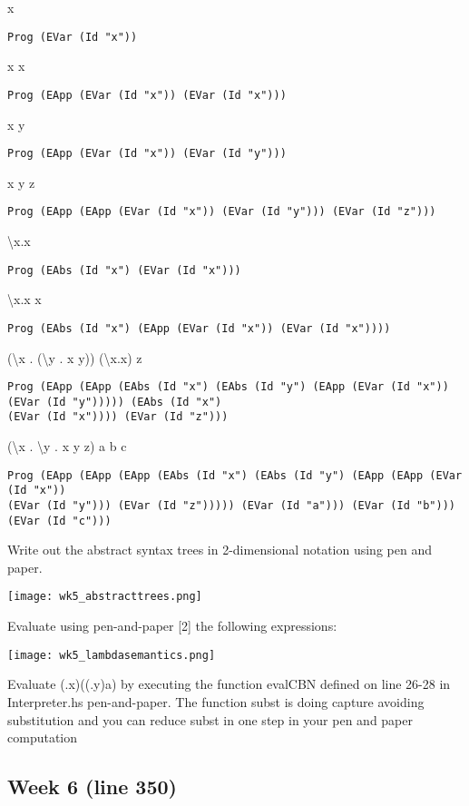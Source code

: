 \documentclass{article}
\theoremstyle{theorem}
\theoremstyle{definition}
\theoremstyle{remark}
\begin{document}
\parindent x
\begin{verbatim}
Prog (EVar (Id "x"))
\end{verbatim}
x x
\begin{verbatim}
Prog (EApp (EVar (Id "x")) (EVar (Id "x")))
\end{verbatim}
x y
\begin{verbatim}
Prog (EApp (EVar (Id "x")) (EVar (Id "y")))
\end{verbatim}
x y z
\begin{verbatim}
Prog (EApp (EApp (EVar (Id "x")) (EVar (Id "y"))) (EVar (Id "z")))
\end{verbatim}
\textbackslash x.x
\begin{verbatim}
Prog (EAbs (Id "x") (EVar (Id "x")))
\end{verbatim}
\textbackslash x.x x
\begin{verbatim}
Prog (EAbs (Id "x") (EApp (EVar (Id "x")) (EVar (Id "x"))))
\end{verbatim}
(\textbackslash x . (\textbackslash y . x y)) (\textbackslash x.x) z
\begin{verbatim}
Prog (EApp (EApp (EAbs (Id "x") (EAbs (Id "y") (EApp (EVar (Id "x")) (EVar (Id "y"))))) (EAbs (Id "x") 
(EVar (Id "x")))) (EVar (Id "z")))
\end{verbatim}
(\textbackslash x . \textbackslash y . x y z) a b c
\begin{verbatim}
Prog (EApp (EApp (EApp (EAbs (Id "x") (EAbs (Id "y") (EApp (EApp (EVar (Id "x")) 
(EVar (Id "y"))) (EVar (Id "z"))))) (EVar (Id "a"))) (EVar (Id "b"))) (EVar (Id "c")))
\end{verbatim}

Write out the abstract syntax trees in 2-dimensional notation using pen and paper.

\texttt{[image: wk5\_abstracttrees.png]}

Evaluate using pen-and-paper [2] the following expressions:

\texttt{[image: wk5\_lambdasemantics.png]}

Evaluate (\x.x)((\y.y)a) by executing the function evalCBN defined on line 26-28 in Interpreter.hs pen-and-paper. The function subst is doing capture avoiding substitution and you can reduce subst in one step in your pen and paper computation



\subsection{Week 6 (line 350)}
\end{document}
